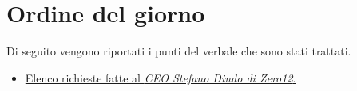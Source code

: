 \clearpage
\section{Ordine del giorno}
Di seguito vengono riportati i punti del verbale che sono stati trattati.
\begin{itemize}
	\item \hyperref[sec:elenco]{ Elenco richieste fatte al \emph{CEO Stefano Dindo di Zero12}.}
\end{itemize}